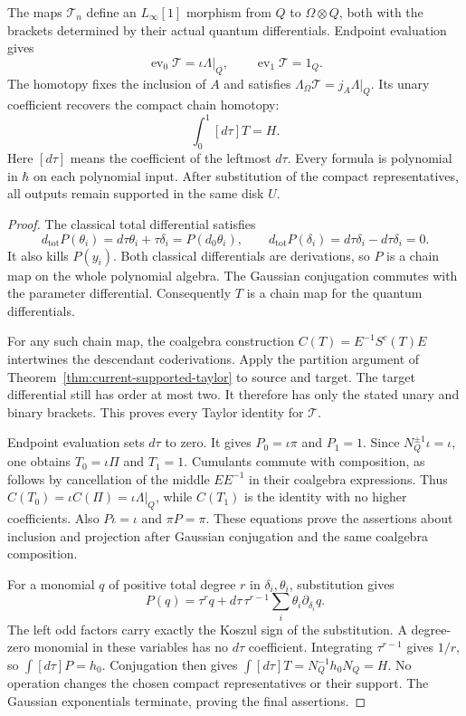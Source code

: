 \begin{theorem}
\label{thm:current-polynomial-higher-homotopy}
The maps $\mathcal T_n$ define an $L_\infty[1]$ morphism from
$Q$ to $\Omega\otimes Q$, both with the brackets determined by
their actual quantum differentials.
Endpoint evaluation gives
\[
 \operatorname{ev}_0\mathcal T=\iota\Lambda|_Q,
 \qquad \operatorname{ev}_1\mathcal T=1_Q.
\]
The homotopy fixes the inclusion of $A$ and satisfies
$\Lambda_\Omega\mathcal T=j_A\Lambda|_Q$.
Its unary coefficient recovers the compact chain homotopy:
\[
 \int_0^1 [d\tau]T=H.
\]
Here $[d\tau]$ means the coefficient of the leftmost $d\tau$.
Every formula is polynomial in $\hbar$ on each polynomial input.
After substitution of the compact representatives, all outputs
remain supported in the same disk $U$.
\end{theorem}
\begin{proof}
The classical total differential satisfies
\[
 d_{\mathrm{tot}}P(\theta_i)=d\tau\theta_i+\tau\delta_i
                           =P(d_0\theta_i),\qquad
 d_{\mathrm{tot}}P(\delta_i)=d\tau\delta_i-d\tau\delta_i=0.
\]
It also kills $P(y_i)$.  Both classical differentials are derivations,
so $P$ is a chain map on the whole polynomial algebra.
The Gaussian conjugation commutes with the parameter differential.
Consequently $T$ is a chain map for the quantum differentials.

For any such chain map, the coalgebra construction
$C(T)=E^{-1}S^c(T)E$ intertwines the descendant coderivations.
Apply the partition argument of
Theorem~\ref{thm:current-supported-taylor} to source and target.
The target differential still has order at most two.
It therefore has only the stated unary and binary brackets.
This proves every Taylor identity for $\mathcal T$.

Endpoint evaluation sets $d\tau$ to zero.
It gives $P_0=\iota\pi$ and $P_1=1$.
Since $N_Q^{\pm1}\iota=\iota$, one obtains
$T_0=\iota\Pi$ and $T_1=1$.
Cumulants commute with composition, as follows by cancellation of
the middle $E E^{-1}$ in their coalgebra expressions.
Thus $C(T_0)=\iota C(\Pi)=\iota\Lambda|_Q$,
while $C(T_1)$ is the identity with no higher coefficients.
Also $P\iota=\iota$ and $\pi P=\pi$.
These equations prove the assertions about inclusion and projection
after Gaussian conjugation and the same coalgebra composition.

For a monomial $q$ of positive total degree $r$ in
$\delta_i,\theta_i$, substitution gives
\[
 P(q)=\tau^r q+d\tau\,\tau^{r-1}
                         \sum_i\theta_i\partial_{\delta_i}q.
\]
The left odd factors carry exactly the Koszul sign of the
substitution.  A degree-zero monomial in these variables has no
$d\tau$ coefficient.  Integrating $\tau^{r-1}$ gives $1/r$,
so $\int[d\tau]P=h_0$.  Conjugation then gives
$\int[d\tau]T=N_Q^{-1}h_0N_Q=H$.
No operation changes the chosen compact representatives or their
support.  The Gaussian exponentials terminate, proving the final assertions.
\end{proof}

